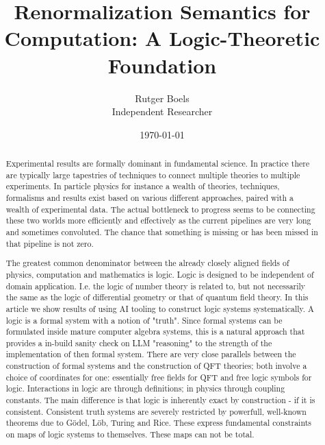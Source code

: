 \documentclass[11pt,a4paper]{article}
\title{Renormalization Semantics for Computation: A Logic-Theoretic Foundation}
\author{Rutger Boels\\Independent Researcher}
\date{\today}
\theoremstyle{definition}
\begin{document}
\maketitle

\begin{abstract}
Experimental results are formally dominant in fundamental science. In practice there are typically large tapestries of techniques to connect multiple theories to multiple experiments. In particle physics for instance a wealth of theories, techniques, formalisms and results exist based on various different approaches, paired with a wealth of experimental data. The actual bottleneck to progress seems to be connecting these two worlds more efficiently and effectively as the current pipelines are very long and sometimes convoluted. The chance that something is missing or has been missed in that pipeline is not zero. 

The greatest common denominator between the already closely aligned fields of physics, computation and mathematics is logic. Logic is designed to be independent of domain application. I.e. the logic of number theory is related to, but not necessarily the same as the logic of differential geometry or that of quantum field theory. In this article we show results of using AI tooling to construct logic systems systematically. A logic is a formal system with a notion of "truth". Since formal systems can be formulated inside mature computer algebra systems, this is a natural approach that provides a in-build sanity check on LLM "reasoning" to the strength of the implementation of then formal system. There are very close parallels between the construction of formal systems and the construction of QFT theories; both involve a choice of coordinates for one: essentially free fields for QFT and free logic symbols for logic. Interactions in logic are through definitions; in physics through coupling constants. The main difference is that logic is inherently exact by construction - if it is consistent. Consistent truth systems are severely restricted by powerfull, well-known theorems due to Gödel, Löb, Turing and Rice. These express fundamental constraints on maps of logic systems to themselves. These maps can not be total.  


\end{abstract}
\end{document}
